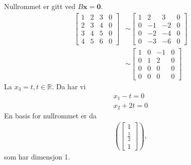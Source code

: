 \documentclass[11pt, a4paper, norsk]{NTNUoving}
\begin{document}
\begin{oppgave}
\begin{punkt}
        Nullrommet er gitt ved $B\textbf{x}=\textbf{0}$.
        \begin{align*}
            \left[
                \begin{array}{ccc|c}
                    1 & 2 & 3 & 0\\
                    2 & 3 & 4 & 0\\
                    3 & 4 & 5 & 0\\
                    4 & 5 & 6 & 0
                \end{array}
             \right]  
             &\sim 
             \left[
                \begin{array}{ccc|c}
                    1 & 2 & 3 & 0\\
                    0 & -1 & -2 & 0\\
                    0 & -2 & -4 & 0\\
                    0 & -3 & -6 & 0
                \end{array}
             \right]  
             \\&\sim 
             \left[
                \begin{array}{ccc|c}
                    1 & 0 & -1 & 0\\
                    0 & 1 & 2 & 0\\
                    0 & 0 & 0 & 0\\
                    0 & 0 & 0 & 0
                \end{array}
             \right]  
        \end{align*}
        La $x_3=t, t\in \mathbb{R}$. Da har vi
        \begin{align*}
            x_1-t=0\\
            x_2+2t=0
        \end{align*}
        En basis for nullrommet er da
        \begin{align*}
            \left(\begin{bmatrix}1\\\frac{1}{2} \\ 1 \end{bmatrix} \right),
        \end{align*}
        som har dimensjon 1.
        

\end{punkt}
\end{oppgave}
\end{document}
